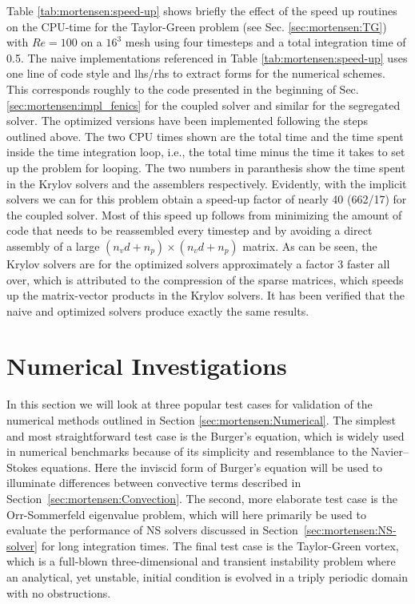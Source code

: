 Table \ref{tab:mortensen:speed-up} shows briefly the effect of the speed up routines on the CPU-time for the Taylor-Green problem (see Sec. \ref{sec:mortensen:TG}) with $Re=100$ on a $16^3$ mesh using four timesteps and a total integration time of 0.5. The naive implementations referenced in Table \ref{tab:mortensen:speed-up} uses one line of code style and lhs/rhs to extract forms for the numerical schemes. This corresponds roughly to the code presented in the beginning of Sec. \ref{sec:mortensen:impl_fenics} for the coupled solver and similar for the segregated solver. The optimized versions have been implemented following the steps outlined above. The two CPU times shown are the total time and the time spent inside the time integration loop, i.e., the total time minus the time it takes to set up the problem for looping. The two numbers in paranthesis show the time spent in the Krylov solvers and the assemblers respectively. Evidently, with the implicit solvers we can for this problem obtain a speed-up factor of nearly 40 (662/17) for the coupled solver. Most of this speed up follows from minimizing the amount of code that needs to be reassembled every timestep and by avoiding a direct assembly of a large $(n_vd+n_p)\times (n_vd+n_p)$ matrix. As can be seen, the Krylov solvers are for the optimized solvers approximately a factor 3 faster all over, which is attributed to the compression of the sparse matrices, which speeds up the matrix-vector products in the Krylov solvers. It has been verified that the naive and optimized solvers produce exactly the same results.

\section{Numerical Investigations}
\label{sec:mortensen:testcases}
In this section we will look at three popular test cases for validation of the numerical methods outlined in Section \ref{sec:mortensen:Numerical}. The simplest and most straightforward test case is the Burger's equation, which is widely used in numerical benchmarks because of its simplicity and resemblance to the Navier--Stokes equations. Here the inviscid form of Burger's equation will be used to illuminate differences between convective terms described in Section~\ref{sec:mortensen:Convection}. The second, more elaborate test case is the Orr-Sommerfeld eigenvalue problem, which will here primarily be used to evaluate the performance of NS solvers discussed in Section~\ref{sec:mortensen:NS-solver} for long integration times. The final test case is the Taylor-Green vortex, which is a full-blown three-dimensional and transient instability problem where an analytical, yet unstable, initial condition is evolved in a triply periodic domain with no obstructions.

